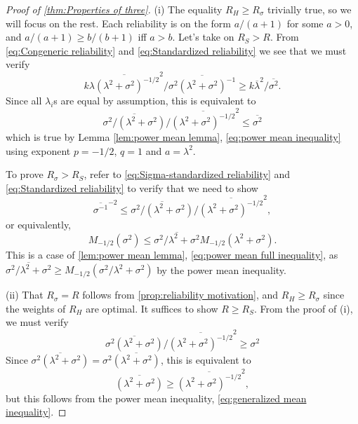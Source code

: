 \documentclass[twoside]{article}
\begin{document}
\begin{proof}[Proof of \cref{thm:Properties of three}]
\label{proof:Properties}
(i) The equality $ R_H \geq  R_\sigma$ trivially true, so we will focus on the rest. Each reliability is on the form $a/(a+1)$ for some $a>0$, and $a/(a+1)\geq b/(b+1)$
iff $a>b$. Let's take on $ R_S >  R$. From \cref{eq:Congeneric reliability} and \cref{eq:Standardized reliability} we see that we must verify
\[
k\overline{\lambda(\lambda^{2}+\sigma^{2})^{-1/2}}^{2}/\overline{\sigma^{2}(\lambda^{2}+\sigma^{2})^{-1}}\geq k\overline{\lambda}^{2}/\overline{\sigma^{2}}.
\]
Since all $\lambda_i$s are equal by assumption, this is equivalent to 
\[
\overline{\sigma^{2}/(\lambda^{2}+\sigma^{2})}/\overline{(\lambda^{2}+\sigma^{2})^{-1/2}}^{2}\leq\overline{\sigma^{2}}
\]
which is true by Lemma \ref{lem:power mean lemma}, \cref{eq:power mean inequality} using exponent $p = -1/2$, $q = 1$ and $a = \lambda^2$.

To prove $ R_{\sigma}> R_{S}$, refer to \cref{eq:Sigma-standardized reliability} and \cref{eq:Standardized reliability} to verify that we need to show
\[
\overline{\sigma^{-1}}^{-2}\leq\overline{\sigma^{2}/(\lambda^{2}+\sigma^{2})}/\overline{(\lambda^{2}+\sigma^{2})^{-1/2}}^{2},
\]
or equivalently,
\[
M_{-1/2}(\sigma^{2})\leq \overline{\sigma^{2}/\lambda^{2}+\sigma^{2}}M_{-1/2}(\lambda^{2}+\sigma^{2}).
\]
This is a case of \cref{lem:power mean lemma}, \cref{eq:power mean full inequality}, as $\overline{\sigma^{2}/\lambda^{2}+\sigma^{2}} \geq M_{-1/2}(\sigma^{2}/\lambda^{2}+\sigma^{2})$ by the power mean inequality.

(ii) That $R_{\sigma}=R$ follows from \cref{prop:reliability motivation}, and $R_{H}\geq R_{\sigma}$
since the weights of $R_{H}$ are optimal. It suffices to show $R\geq R_{S}$.
From the proof of (i), we must verify
\[
\overline{\sigma^{2}(\lambda^{2}+\sigma^{2})}/\overline{(\lambda^{2}+\sigma^{2})^{-1/2}}^{2}\geq\sigma^{2}
\]
Since $\overline{\sigma^{2}(\lambda^{2}+\sigma^{2})}=\sigma^{2}\overline{(\lambda^{2}+\sigma^{2})}$,
this is equivalent to
\[
\overline{(\lambda^{2}+\sigma^{2})}\geq\overline{(\lambda^{2}+\sigma^{2})^{-1/2}}^{2},
\]
but this follows from the power mean inequality, \cref{eq:generalized mean inequality}.


\end{proof}
\end{document}
